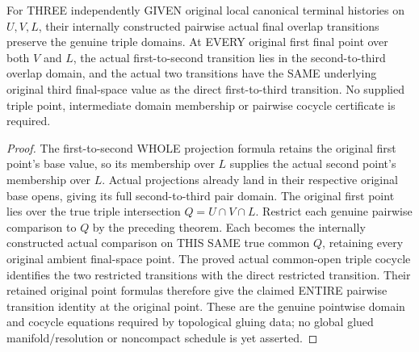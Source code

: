 \begin{theorem}
\label{hir:original-independent-local-pairwise-terminal-triple-transition-laws}
\leanok
For THREE independently GIVEN original local canonical terminal histories
on $U,V,L$, their internally constructed pairwise actual final overlap
transitions preserve the genuine triple domains. At EVERY original first
final point over both $V$ and $L$, the actual first-to-second transition
lies in the second-to-third overlap domain, and the actual two transitions
have the SAME underlying original third final-space value as the direct
first-to-third transition. No supplied triple point, intermediate domain
membership or pairwise cocycle certificate is required.
\end{theorem}
\begin{proof}
The first-to-second WHOLE projection formula retains the original first
point's base value, so its membership over $L$ supplies the actual second
point's membership over $L$. Actual projections already land in their
respective original base opens, giving its full second-to-third pair
domain. The original first point lies over the true triple intersection
$Q=U\cap V\cap L$. Restrict each genuine pairwise comparison to $Q$ by
the preceding theorem. Each becomes the internally constructed actual
comparison on THIS SAME true common $Q$, retaining every original ambient
final-space point. The proved actual common-open triple cocycle identifies
the two restricted transitions with the direct restricted transition.
Their retained original point formulas therefore give the claimed ENTIRE
pairwise transition identity at the original point. These are the genuine
pointwise domain and cocycle equations required by topological gluing
data; no global glued manifold/resolution or noncompact schedule is yet
asserted.
\end{proof}
